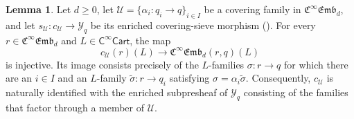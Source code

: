\documentclass{amsart}
\newcommand{\cat}[1]{\mathsf{#1}}
\newcommand{\Cart}{\cat{C}^{\infty}\cat{Cart}}
\newcommand{\femb}[1]{\mathfrak{C}^{\infty}\mathfrak{Emb}_{#1}}
\newcommand{\Yo}{\mathscr{Y}}
\theoremstyle{definition}
\newtheorem{lemma}[equation]{Lemma}
\numberwithin{equation}{subsection}
\numberwithin{subsubsection}{subsection}
\begin{document}
\begin{lemma}\label{lem:femb.enriched.covering.sieve}
  Let \(d\geq 0\), let \(\mathcal{U}=\{\alpha_i:q_i\to q\}_{i\in I}\) be a
  covering family in \(\femb{d}\), and let
  \(s_{\mathcal{U}}:c_{\mathcal{U}}\to\Yo_q\) be its enriched
  covering-sieve morphism (). For every
  \(r\in\femb{d}\) and \(L\in\Cart\),
  the map
  \[
    c_{\mathcal{U}}(r)(L)\longrightarrow\femb{d}(r,q)(L)
  \]
  is injective. Its image consists precisely of the \(L\)-families
  \(\sigma:r\to q\) for which there are an \(i\in I\) and an
  \(L\)-family \(\widetilde\sigma:r\to q_i\) satisfying
  \(\sigma=\alpha_i\widetilde\sigma\). Consequently,
  \(c_{\mathcal{U}}\) is naturally identified with the enriched
  subpresheaf of \(\Yo_q\) consisting of the families that factor through
  a member of \(\mathcal{U}\).
\end{lemma}
\end{document}
